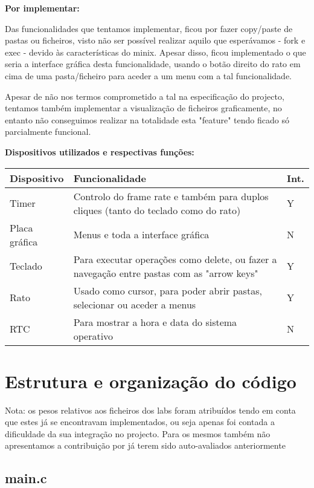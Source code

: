 \documentclass[a4paper]{article}
\begin{document}
\textbf {Por implementar:}\bigskip

Das funcionalidades que tentamos implementar, ficou por fazer copy/paste de pastas ou ficheiros, visto não ser possível realizar aquilo que esperávamos - fork e exec - devido às características do minix. Apesar disso, ficou implementado o que seria a interface gráfica desta funcionalidade, usando o botão direito do rato em cima de uma pasta/ficheiro para aceder a um menu com a tal funcionalidade.

Apesar de não nos termos comprometido a tal na especificação do projecto, tentamos também implementar a visualização de ficheiros graficamente, no entanto não conseguimos realizar na totalidade esta "feature" tendo ficado só parcialmente funcional.\bigskip

\textbf {Dispositivos utilizados e respectivas funções:}\bigskip


\begin{center}
    \begin{tabular}{ | l | p{7cm} | l |}
    \hline
    Dispositivo & Funcionalidade & Int. \\ \hline
    Timer & Controlo do frame rate e também para duplos cliques (tanto do teclado como do rato) & Y \\ \hline
    Placa gráfica & Menus e toda a interface gráfica & N \\ \hline
    Teclado & Para executar operações como delete, ou fazer a navegação entre pastas com as "arrow keys" & Y \\ \hline
    Rato  & Usado como cursor, para poder abrir pastas, selecionar ou aceder a menus & Y  \\ \hline
    RTC & Para mostrar a hora e data do sistema operativo & N \\
    \hline
    \end{tabular}
\end{center}\bigskip


\newpage
\section{Estrutura e organização do código}

Nota: os pesos relativos aos ficheiros dos labs foram atribuídos tendo em conta que estes já se encontravam implementados, ou seja apenas foi contada a dificuldade da sua integração no projecto. Para os mesmos também não apresentamos a contribuição por já terem sido auto-avaliados anteriormente\bigskip


\subsection{main.c}
\end{document}
